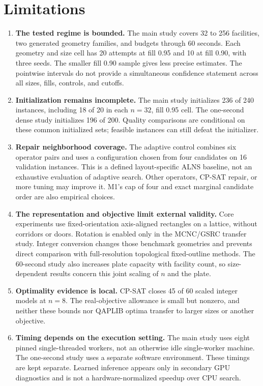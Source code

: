 \documentclass[preprint,12pt,authoryear,nonatbib]{elsarticle}
\begin{document}
\section{Limitations}
\label{sec:limitations}

\begin{enumerate}
\item \textbf{The tested regime is bounded.} The main study covers 32 to
256 facilities, two generated geometry families, and budgets through 60 seconds.
Each geometry and size cell has 20 attempts at fill 0.95 and 10 at fill 0.90,
with three seeds. The smaller fill 0.90 sample gives less precise estimates.
The pointwise intervals do not provide a simultaneous confidence statement
across all sizes, fills, controls, and cutoffs.

\item \textbf{Initialization remains incomplete.} The main study initializes
236 of 240 instances, including 18 of 20 in each $n=32$, fill 0.95 cell.
The one-second dense study initializes 196 of 200. Quality comparisons are
conditional on these common initialized sets; feasible instances can still
defeat the initializer.

\item \textbf{Repair neighborhood coverage.} The adaptive control combines
six operator pairs and uses a configuration chosen from four candidates on
16 validation instances. This is a defined layout-specific ALNS baseline,
not an exhaustive evaluation of adaptive search. Other operators, CP-SAT
repair, or more tuning may improve it. M1's cap of four and exact marginal
candidate order are also empirical choices.

\item \textbf{The representation and objective limit external validity.}
Core experiments use fixed-orientation axis-aligned rectangles on a lattice,
without corridors or doors. Rotation is enabled only in the MCNC/GSRC transfer
study. Integer conversion changes those benchmark geometries and prevents
direct comparison with full-resolution topological fixed-outline methods.
The 60-second study also increases plate capacity with facility count, so
size-dependent results concern this joint scaling of $n$ and the plate.

\item \textbf{Optimality evidence is local.} CP-SAT closes 45 of 60 scaled
integer models at $n=8$. The real-objective allowance is small but nonzero,
and neither these bounds nor QAPLIB optima transfer to larger sizes or
another objective.

\item \textbf{Timing depends on the execution setting.} The main study uses
eight pinned single-threaded workers, not an otherwise idle single-worker
machine. The one-second study uses a separate software environment. These
timings are kept separate. Learned inference appears only in secondary
GPU diagnostics and is not a hardware-normalized speedup over CPU search.
\end{enumerate}
\end{document}
